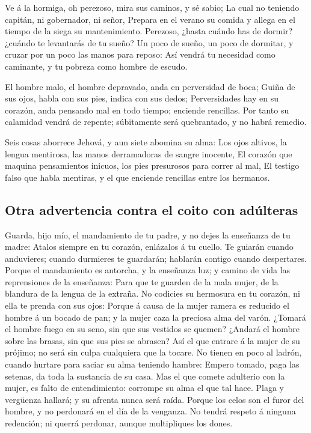  Ve á la hormiga, oh perezoso, mira sus caminos, y sé sabio;
 La cual no teniendo capitán, ni gobernador, ni señor,
 Prepara en el verano su comida y allega en el tiempo de la
siega su mantenimiento.  Perezoso, ¿hasta cuándo has de
dormir? ¿cuándo te levantarás de tu sueño?  Un poco de
sueño, un poco de dormitar, y cruzar por un poco las manos para reposo:
 Así vendrá tu necesidad como caminante, y tu pobreza como
hombre de escudo.

 El hombre malo, el hombre depravado, anda en perversidad
de boca;  Guiña de sus ojos, habla con sus pies, indica con
sus dedos;  Perversidades hay en su corazón, anda pensando
mal en todo tiempo; enciende rencillas.  Por tanto su
calamidad vendrá de repente; súbitamente será quebrantado, y no habrá
remedio.

 Seis cosas aborrece Jehová, y aun siete abomina su alma:
 Los ojos altivos, la lengua mentirosa, las manos
derramadoras de sangre inocente,  El corazón que maquina
pensamientos inicuos, los pies presurosos para correr al mal,
 El testigo falso que habla mentiras, y el que enciende
rencillas entre los hermanos.

\hypertarget{otra-advertencia-contra-el-coito-con-aduxfalteras}{%
\subsection{Otra advertencia contra el coito con
adúlteras}\label{otra-advertencia-contra-el-coito-con-aduxfalteras}}

 Guarda, hijo mío, el mandamiento de tu padre, y no dejes
la enseñanza de tu madre:  Atalos siempre en tu corazón,
enlázalos á tu cuello.  Te guiarán cuando anduvieres;
cuando durmieres te guardarán; hablarán contigo cuando despertares.
 Porque el mandamiento es antorcha, y la enseñanza luz; y
camino de vida las reprensiones de la enseñanza:  Para que
te guarden de la mala mujer, de la blandura de la lengua de la extraña.
 No codicies su hermosura en tu corazón, ni ella te prenda
con sus ojos:  Porque á causa de la mujer ramera es
reducido el hombre á un bocado de pan; y la mujer caza la preciosa alma
del varón.  ¿Tomará el hombre fuego en su seno, sin que sus
vestidos se quemen?  ¿Andará el hombre sobre las brasas,
sin que sus pies se abrasen?  Así el que entrare á la mujer
de su prójimo; no será sin culpa cualquiera que la tocare. 
No tienen en poco al ladrón, cuando hurtare para saciar su alma teniendo
hambre:  Empero tomado, paga las setenas, da toda la
sustancia de su casa.  Mas el que comete adulterio con la
mujer, es falto de entendimiento: corrompe su alma el que tal hace.
 Plaga y vergüenza hallará; y su afrenta nunca será raída.
 Porque los celos son el furor del hombre, y no perdonará
en el día de la venganza.  No tendrá respeto á ninguna
redención; ni querrá perdonar, aunque multipliques los dones.

